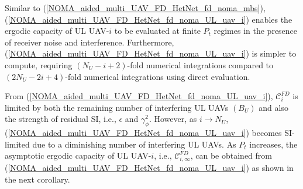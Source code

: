 Similar to (\ref{NOMA_aided_multi_UAV_FD_HetNet_fd_noma_mbs}), (\ref{NOMA_aided_multi_UAV_FD_HetNet_fd_noma_UL_uav_i}) enables the ergodic capacity of UL UAV-$i$ to be evaluated at finite $P_t$ regimes in the presence of receiver noise and interference. Furthermore, (\ref{NOMA_aided_multi_UAV_FD_HetNet_fd_noma_UL_uav_i}) is simpler to compute, requiring $(N_U-i + 2)$-fold numerical integrations compared to $(2N_U - 2i + 4)$-fold numerical integrations using direct evaluation. 

From (\ref{NOMA_aided_multi_UAV_FD_HetNet_fd_noma_UL_uav_i}), $\mathcal{C}_{i}^{FD}$ is limited by both the remaining number of interfering UL UAVs $(B_U)$ and also the strength of residual SI, i.e., $\epsilon$ and $\gamma_{\phi}^2$. However, as $i \to N_U$, (\ref{NOMA_aided_multi_UAV_FD_HetNet_fd_noma_UL_uav_i}) becomes SI-limited due to a diminishing number of interfering UL UAVs. As $P_t$ increases, the asymptotic ergodic capacity of UL UAV-$i$, i.e., $\mathcal{C}_{i,\infty}^{FD}$, can be obtained from (\ref{NOMA_aided_multi_UAV_FD_HetNet_fd_noma_UL_uav_i}) as shown in the next corollary.

